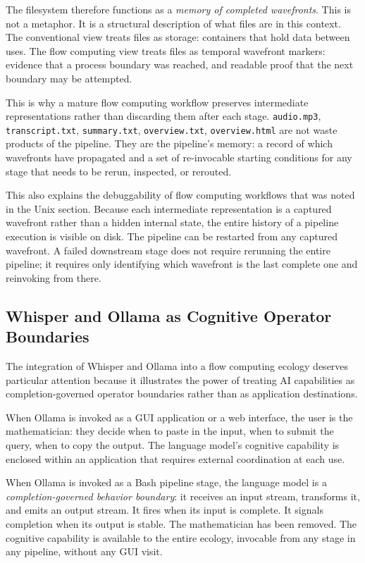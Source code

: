\documentclass[12pt, a4paper]{article}
\begin{document}
The filesystem therefore functions as a \emph{memory of completed
wavefronts}. This is not a metaphor. It is a structural description
of what files are in this context. The conventional view treats
files as storage: containers that hold data between uses. The flow
computing view treats files as temporal wavefront markers: evidence
that a process boundary was reached, and readable proof that the
next boundary may be attempted.

This is why a mature flow computing workflow preserves intermediate
representations rather than discarding them after each stage.
\texttt{audio.mp3}, \texttt{transcript.txt}, \texttt{summary.txt},
\texttt{overview.txt}, \texttt{overview.html} are not waste
products of the pipeline. They are the pipeline's memory: a
record of which wavefronts have propagated and a set of
re-invocable starting conditions for any stage that needs to be
rerun, inspected, or rerouted.

This also explains the debuggability of flow computing workflows
that was noted in the Unix section. Because each intermediate
representation is a captured wavefront rather than a hidden internal
state, the entire history of a pipeline execution is visible on
disk. The pipeline can be restarted from any captured wavefront.
A failed downstream stage does not require rerunning the entire
pipeline; it requires only identifying which wavefront is the last
complete one and reinvoking from there.

\subsection{Whisper and Ollama as Cognitive Operator Boundaries}

The integration of Whisper and Ollama into a flow computing ecology
deserves particular attention because it illustrates the power of
treating AI capabilities as completion-governed operator boundaries
rather than as application destinations.

When Ollama is invoked as a GUI application or a web interface,
the user is the mathematician: they decide when to paste in the
input, when to submit the query, when to copy the output. The
language model's cognitive capability is enclosed within an
application that requires external coordination at each use.

When Ollama is invoked as a Bash pipeline stage, the language
model is a \emph{completion-governed behavior boundary}: it receives
an input stream, transforms it, and emits an output stream. It fires
when its input is complete. It signals completion when its output is
stable. The mathematician has been removed. The cognitive capability
is available to the entire ecology, invocable from any stage in any
pipeline, without any GUI visit.
\end{document}
